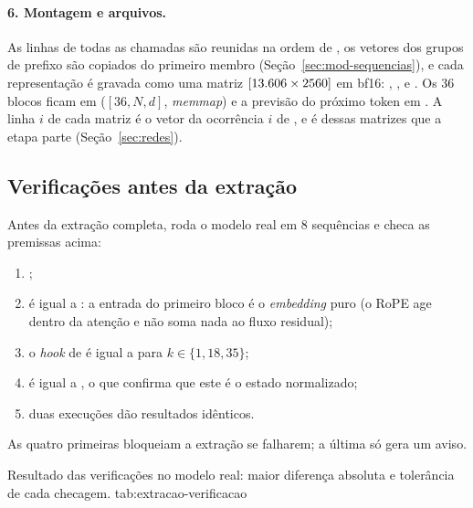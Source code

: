\paragraph{6. Montagem e arquivos.} As linhas de todas as chamadas são reunidas na ordem de
, os vetores dos grupos de prefixo são copiados do primeiro membro
(Seção~\ref{sec:mod-sequencias}), e cada representação é gravada como uma matriz
$[13.606\times2560]$ em bf16: , ,  e
. Os 36 blocos ficam em  ($[36, N, d]$, \emph{memmap}) e a
previsão do próximo token em . A linha $i$ de cada matriz é o vetor
da ocorrência $i$ de , e é dessas matrizes que a etapa  parte
(Seção~\ref{sec:redes}).

\subsection{Verificações antes da extração}\label{sec:mod-verificacao}

Antes da extração completa,  roda o modelo real em 8
sequências e checa as premissas acima:
\begin{enumerate}
    \item {};
    \item {} é igual a : a entrada do primeiro bloco
    é o \emph{embedding} puro (o RoPE age dentro da atenção e não soma nada ao fluxo residual);
    \item o \emph{hook} de  é igual a  para
    $k\in\{1,18,35\}$;
    \item {} é igual a , o que confirma que este é o
    estado normalizado;
    \item duas execuções dão resultados idênticos.
\end{enumerate}
As quatro primeiras bloqueiam a extração se falharem; a última só gera um aviso.

    {Resultado das verificações no modelo real: maior diferença absoluta e tolerância de cada
    checagem.}
    {tab:extracao-verificacao}

